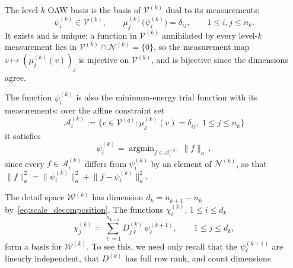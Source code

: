 The level-$k$ OAW basis is the basis of $\mathcal{V}^{(k)}$ dual to its
measurements:
\begin{equation}\label{eq:dual_basis}
  \psi^{(k)}_i \in \mathcal{V}^{(k)},
  \qquad \mu^{(k)}_j\bigl(\psi^{(k)}_i\bigr) = \delta_{ij},
  \qquad 1 \leq i, j \leq n_k .
\end{equation}
It exists and is unique: a function in $\mathcal{V}^{(k)}$ annihilated by
every level-$k$ measurement lies in $\mathcal{V}^{(k)} \cap
\mathcal{N}^{(k)} = \{0\}$, so the measurement map $v \mapsto
(\mu^{(k)}_j(v))_j$ is injective on $\mathcal{V}^{(k)}$, and is bijective
since the dimensions agree.

The function $\psi^{(k)}_i$ is also the minimum-energy trial function with
its measurements: over the affine constraint set
\begin{equation}
  \mathcal{A}^{(k)}_i
  := \{v \in \mathcal{V}^{(q)} : \mu^{(k)}_j(v) = \delta_{ij},\;
       1 \leq j \leq n_k\}
\end{equation}
it satisfies
\begin{equation}
    \psi^{(k)}_i = \operatorname{argmin}_{f \in \mathcal{A}^{(k)}_i} \lVert f\rVert_a \, ,
\end{equation}
since every $f \in \mathcal{A}^{(k)}_i$ differs from $\psi^{(k)}_i$ by an
element of $\mathcal{N}^{(k)}$, so that $\lVert f \rVert_a^2 = \lVert
\psi^{(k)}_i \rVert_a^2 + \lVert f - \psi^{(k)}_i \rVert_a^2$.

The detail space $\mathcal{W}^{(k)}$ has dimension $d_k = n_{k+1} - n_k$
by~\eqref{eq:scale_decomposition}. The functions $\chi^{(k)}_i$, $1 \leq i \leq d_k$
\begin{equation}
  \chi^{(k)}_j = \sum_{\ell=1}^{n_{k+1}} D^{(k)}_{j\ell}\,\psi^{(k+1)}_\ell,
  \qquad 1 \leq j \leq d_k,
\end{equation}
form a basis for $\mathcal{W}^{(k)}$. To see this, we need only recall that the $\psi^{(k+1)}_{\ell}$ are linearly independent, that $D^{(k)}$ has full row rank, and count dimensions.

